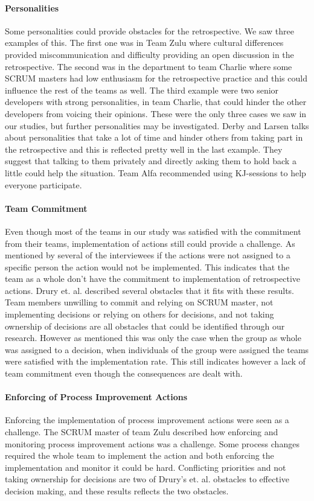 \paragraph{Personalities}
Some personalities could provide obstacles for the retrospective. We saw three examples of this. The first one was in Team Zulu where cultural differences provided miscommunication and difficulty providing an open discussion in the retrospective. The second was in the department to team Charlie where some SCRUM masters had low enthusiasm for the retrospective practice and this could influence the rest of the teams as well. The third example were two senior developers with strong personalities, in team Charlie, that could hinder the other developers from voicing their opinions. These were the only three cases we saw in our studies, but further personalities may be investigated. Derby and Larsen \cite{Larsen2006} talks about personalities that take a lot of time and hinder others from taking part in the retrospective and this is reflected pretty well in the last example. They suggest that talking to them privately and directly asking them to hold back a little could help the situation. Team Alfa recommended using KJ-sessions to help everyone participate.

\paragraph{Team Commitment}
Even though most of the teams in our study was satisfied with the commitment from their teams, implementation of actions still could provide a challenge. As mentioned by several of the interviewees if the actions were not assigned to a specific person the action would not be implemented. This indicates that the team as a whole don't have the commitment to implementation of retrospective actions. Drury et. al. \cite{Drury2012} described several obstacles that it fits with these results. Team members unwilling to commit and relying on SCRUM master, not implementing decisions or relying on others for decisions, and not taking ownership of decisions are all obstacles that could be identified through our research. However as mentioned this was only the case when the group as whole was assigned to a decision, when individuals of the group were assigned the teams were satisfied with the implementation rate. This still indicates however a lack of team commitment even though the consequences are dealt with. 

\paragraph{Enforcing of Process Improvement Actions}
Enforcing the implementation of process improvement actions were seen as a challenge. The SCRUM master of team Zulu described how enforcing and monitoring process improvement actions was a challenge. Some process changes required the whole team to implement the action and both enforcing the implementation and monitor it could be hard. Conflicting priorities and not taking ownership for decisions are two of Drury's et. al. \cite{Drury2012} obstacles to effective decision making, and these results reflects the two obstacles. 

